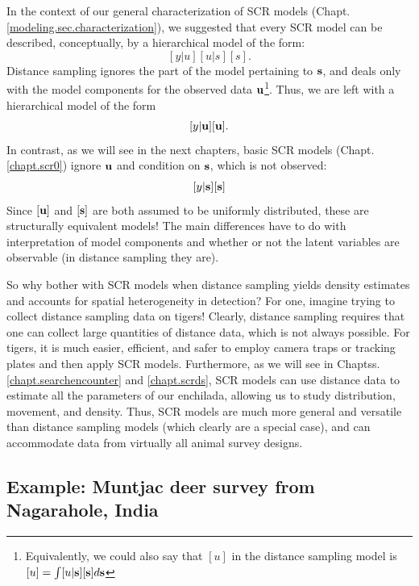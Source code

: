 In the context of our general characterization of SCR models 
(Chapt. \ref{modeling.sec.characterization}),
we suggested that every SCR model can be described,
conceptually, by a hierarchical model of the form:
\[
 [y|u][u|s][s].
\]
Distance sampling ignores the part of the model pertaining to ${\bf
  s}$, and deals only with the model components for the observed
data  ${\bf u}$\footnote{Equivalently, we could also say that $[u]$ in
  the distance sampling model is $[u] = \int [u|{\bf s}][{\bf s}]
  d{\bf s}$}. Thus, we are left with a hierarchical model of the form
\[
[y|{\bf u}][{\bf u}].
\]
In contrast, as we will see in the next chapters, basic SCR models
(Chapt. \ref{chapt.scr0}) ignore ${\bf u}$ and condition on ${\bf s}$,
which is not observed:
\[
[y|{\bf s}][{\bf s}]
\]
Since $[{\bf u}]$ and $[{\bf s}]$ are both assumed to be uniformly
distributed, these are structurally equivalent models! The main
differences have to do with interpretation of model components and
whether or not the latent variables are observable (in distance
sampling they are).

So why bother with SCR models when distance sampling yields density
estimates and accounts for spatial heterogeneity in detection? For
one, imagine trying to collect distance sampling data on tigers!
Clearly, distance sampling requires that one can collect large
quantities of distance data, which is not always possible. For tigers,
it is much easier, efficient, and safer to employ camera traps or
tracking plates and then apply SCR models. Furthermore, as we will see
in Chaptss.  \ref{chapt.searchencounter} and \ref{chapt.scrds}, SCR
models can use distance data to estimate all the parameters of our
enchilada, allowing us to study distribution, movement, and
density. Thus, SCR models are much more general and versatile than
distance sampling models (which clearly are a special case), and can
accommodate data from virtually all animal survey designs.


\subsection{Example: Muntjac deer survey from Nagarahole, India }

